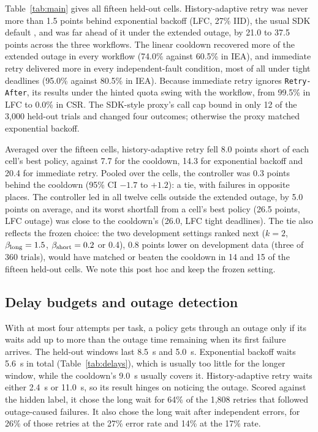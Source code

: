 \documentclass[conference,a4paper]{IEEEtran}
\begin{document}
Table~\ref{tab:main} gives all fifteen held-out cells. History-adaptive retry was never more than 1.5 points behind exponential backoff (LFC, 27\% IID), the usual SDK default \cite{awsretry,grpc}, and was far ahead of it under the extended outage, by 21.0 to 37.5 points across the three workflows. The linear cooldown recovered more of the extended outage in every workflow (74.0\% against 60.5\% in IEA), and immediate retry delivered more in every independent-fault condition, most of all under tight deadlines (95.0\% against 80.5\% in IEA). Because immediate retry ignores \texttt{Retry-After}, its results under the hinted quota swing with the workflow, from 99.5\% in LFC to 0.0\% in CSR. The SDK-style proxy's call cap bound in only 12 of the 3,000 held-out trials and changed four outcomes; otherwise the proxy matched exponential backoff.

Averaged over the fifteen cells, history-adaptive retry fell 8.0 points short of each cell's best policy, against 7.7 for the cooldown, 14.3 for exponential backoff and 20.4 for immediate retry. Pooled over the cells, the controller was 0.3 points behind the cooldown (95\% CI $-1.7$ to $+1.2$): a tie, with failures in opposite places. The controller led in all twelve cells outside the extended outage, by 5.0 points on average, and its worst shortfall from a cell's best policy (26.5 points, LFC outage) was close to the cooldown's (26.0, LFC tight deadlines). The tie also reflects the frozen choice: the two development settings ranked next ($k=2$, $\beta_{\rm long}=1.5$, $\beta_{\rm short}=0.2$ or 0.4), 0.8 points lower on development data (three of 360 trials), would have matched or beaten the cooldown in 14 and 15 of the fifteen held-out cells. We note this post hoc and keep the frozen setting.

\subsection{Delay budgets and outage detection}
With at most four attempts per task, a policy gets through an outage only if its waits add up to more than the outage time remaining when its first failure arrives. The held-out windows last 8.5~s and 5.0~s. Exponential backoff waits 5.6~s in total (Table~\ref{tab:delays}), which is usually too little for the longer window, while the cooldown's 9.0~s usually covers it. History-adaptive retry waits either 2.4~s or 11.0~s, so its result hinges on noticing the outage. Scored against the hidden label, it chose the long wait for 64\% of the 1,808 retries that followed outage-caused failures. It also chose the long wait after independent errors, for 26\% of those retries at the 27\% error rate and 14\% at the 17\% rate.
\end{document}
